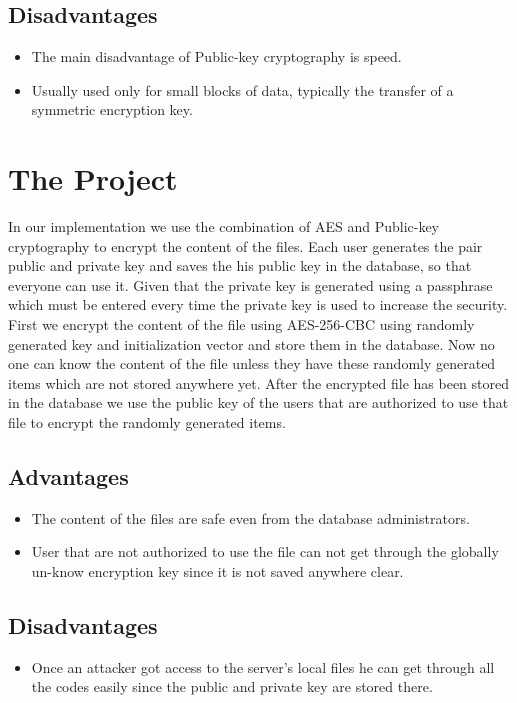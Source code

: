 \subsection{Disadvantages}
\begin{itemize}
	\item The main disadvantage of Public-key cryptography is speed.
	\item Usually used only for small blocks of data, typically the transfer of a symmetric encryption key.
\end{itemize}

\section{The Project}
In our implementation we use the combination of AES and Public-key cryptography to encrypt the content of the files.
Each user generates the pair public and private key and saves the his public key in the database, so that everyone can use it. Given that the private key is generated using a passphrase which must be entered every time the private key is used to increase the security.
First we encrypt the content of the file using AES-256-CBC using randomly generated key and initialization vector and store them in the database. Now no one can know the content of the file unless they have these randomly generated items which are not stored anywhere yet. After the encrypted file has been stored in the database we use the public key of the users that are authorized to use that file to encrypt the randomly generated items.
\subsection{Advantages}
\begin{itemize}
	\item The content of the files are safe even from the database administrators.
	\item User that are not authorized to use the file can not get through the globally un-know encryption key since it is not saved anywhere clear.
\end{itemize}
\subsection{Disadvantages}
\begin{itemize}
	\item Once an attacker got access to the server's local files he can get through all the codes easily since the public and private key are stored there.
\end{itemize}